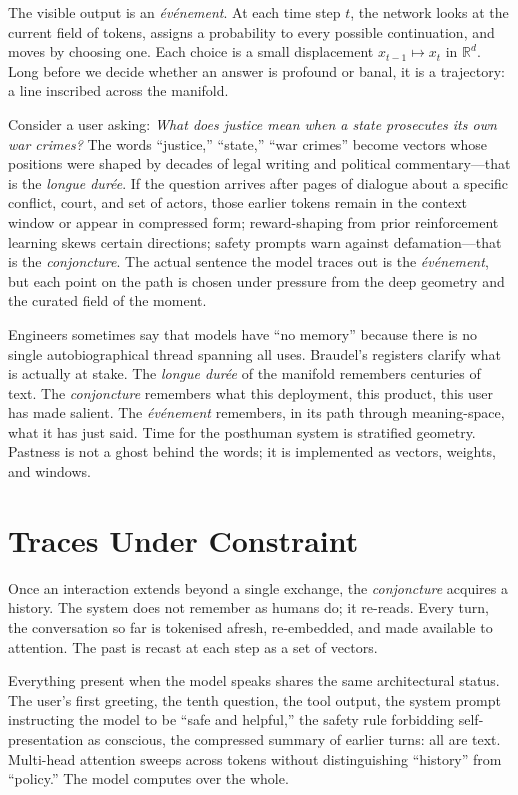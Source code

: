 \documentclass[12pt,a4paper]{article}
\begin{document}
The visible output is an \emph{\'ev\'enement}. At each time step $t$, the network looks at the current field of tokens, assigns a probability to every possible continuation, and moves by choosing one. Each choice is a small displacement $x_{t-1} \mapsto x_t$ in $\mathbb{R}^d$. Long before we decide whether an answer is profound or banal, it is a trajectory: a line inscribed across the manifold.

Consider a user asking: \textit{What does justice mean when a state prosecutes its own war crimes?} The words ``justice,'' ``state,'' ``war crimes'' become vectors whose positions were shaped by decades of legal writing and political commentary---that is the \emph{longue dur\'ee}. If the question arrives after pages of dialogue about a specific conflict, court, and set of actors, those earlier tokens remain in the context window or appear in compressed form; reward-shaping from prior reinforcement learning skews certain directions; safety prompts warn against defamation---that is the \emph{conjoncture}. The actual sentence the model traces out is the \emph{\'ev\'enement}, but each point on the path is chosen under pressure from the deep geometry and the curated field of the moment.

Engineers sometimes say that models have ``no memory'' because there is no single autobiographical thread spanning all uses. Braudel's registers clarify what is actually at stake. The \emph{longue dur\'ee} of the manifold remembers centuries of text. The \emph{conjoncture} remembers what this deployment, this product, this user has made salient. The \emph{\'ev\'enement} remembers, in its path through meaning-space, what it has just said. Time for the posthuman system is stratified geometry. Pastness is not a ghost behind the words; it is implemented as vectors, weights, and windows.

\section{Traces Under Constraint}

Once an interaction extends beyond a single exchange, the \emph{conjoncture} acquires a history. The system does not remember as humans do; it re-reads. Every turn, the conversation so far is tokenised afresh, re-embedded, and made available to attention. The past is recast at each step as a set of vectors.

Everything present when the model speaks shares the same architectural status. The user's first greeting, the tenth question, the tool output, the system prompt instructing the model to be ``safe and helpful,'' the safety rule forbidding self-presentation as conscious, the compressed summary of earlier turns: all are text. Multi-head attention sweeps across tokens without distinguishing ``history'' from ``policy.'' The model computes over the whole.
\end{document}
